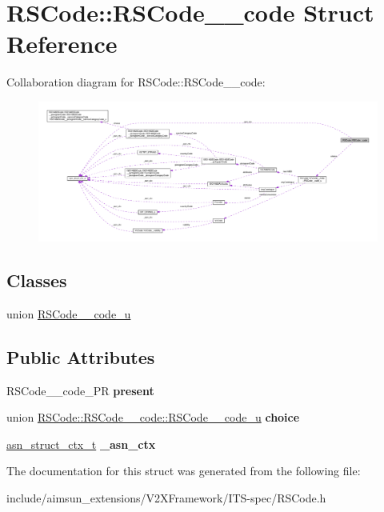 \hypertarget{structRSCode_1_1RSCode____code}{}\section{R\+S\+Code\+:\+:R\+S\+Code\+\_\+\+\_\+code Struct Reference}
\label{structRSCode_1_1RSCode____code}


Collaboration diagram for R\+S\+Code\+:\+:R\+S\+Code\+\_\+\+\_\+code\+:\nopagebreak
\begin{figure}[H]
\begin{center}
\leavevmode
\includegraphics[width=350pt]{structRSCode_1_1RSCode____code__coll__graph}
\end{center}
\end{figure}
\subsection*{Classes}
\begin{DoxyCompactItemize}
\item 
union \hyperlink{unionRSCode_1_1RSCode____code_1_1RSCode____code__u}{R\+S\+Code\+\_\+\+\_\+code\+\_\+u}
\end{DoxyCompactItemize}
\subsection*{Public Attributes}
\begin{DoxyCompactItemize}
\item 
R\+S\+Code\+\_\+\+\_\+code\+\_\+\+PR {\bfseries present}\hypertarget{structRSCode_1_1RSCode____code_a08213d666fcc0f6587c17a4dd146a57d}{}\label{structRSCode_1_1RSCode____code_a08213d666fcc0f6587c17a4dd146a57d}

\item 
union \hyperlink{unionRSCode_1_1RSCode____code_1_1RSCode____code__u}{R\+S\+Code\+::\+R\+S\+Code\+\_\+\+\_\+code\+::\+R\+S\+Code\+\_\+\+\_\+code\+\_\+u} {\bfseries choice}\hypertarget{structRSCode_1_1RSCode____code_ad6fb40169cc35853277da75dd737ed20}{}\label{structRSCode_1_1RSCode____code_ad6fb40169cc35853277da75dd737ed20}

\item 
\hyperlink{structasn__struct__ctx__s}{asn\+\_\+struct\+\_\+ctx\+\_\+t} {\bfseries \+\_\+asn\+\_\+ctx}\hypertarget{structRSCode_1_1RSCode____code_ae8c0ea304a02778e75af21ed8ad9717a}{}\label{structRSCode_1_1RSCode____code_ae8c0ea304a02778e75af21ed8ad9717a}

\end{DoxyCompactItemize}


The documentation for this struct was generated from the following file\+:\begin{DoxyCompactItemize}
\item 
include/aimsun\+\_\+extensions/\+V2\+X\+Framework/\+I\+T\+S-\/spec/R\+S\+Code.\+h\end{DoxyCompactItemize}
